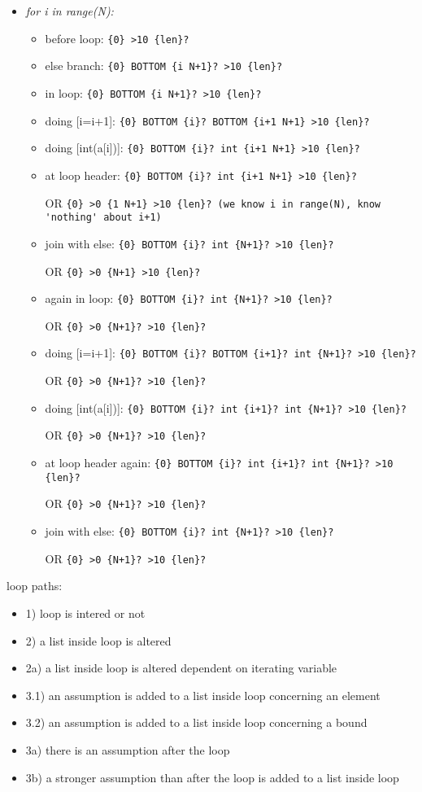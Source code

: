 \documentclass[11pt]{article}
\begin{document}
\begin{itemize}
\item \textit{for i in range(N):}
\begin{itemize}
\item before loop: \verb|{0} >10 {len}?|
\item else branch: \verb|{0} BOTTOM {i N+1}? >10 {len}?|
\item in loop: \verb|{0} BOTTOM {i N+1}? >10 {len}?|
\item doing [i=i+1]: \verb|{0} BOTTOM {i}? BOTTOM {i+1 N+1} >10 {len}?|
\item doing [int(a[i])]: \verb|{0} BOTTOM {i}? int {i+1 N+1} >10 {len}?|
\item at loop header: \verb|{0} BOTTOM {i}? int {i+1 N+1} >10 {len}?| 

OR \verb|{0} >0 {1 N+1} >10 {len}? (we know i in range(N), know 'nothing' about i+1)|
\item join with else: \verb|{0} BOTTOM {i}? int {N+1}? >10 {len}?| 

OR \verb|{0} >0 {N+1} >10 {len}?|
\item again in loop: \verb|{0} BOTTOM {i}? int {N+1}? >10 {len}?| 

OR \verb|{0} >0 {N+1}? >10 {len}?|
\item doing [i=i+1]: \verb|{0} BOTTOM {i}? BOTTOM {i+1}? int {N+1}? >10 {len}?| 

OR \verb|{0} >0 {N+1}? >10 {len}?|
\item doing [int(a[i])]: \verb|{0} BOTTOM {i}? int {i+1}? int {N+1}? >10 {len}?|

OR \verb|{0} >0 {N+1}? >10 {len}?|
\item at loop header again: \verb|{0} BOTTOM {i}? int {i+1}? int {N+1}? >10 {len}?| 

OR \verb|{0} >0 {N+1}? >10 {len}?|
\item join with else: \verb|{0} BOTTOM {i}? int {N+1}? >10 {len}?| 

OR \verb|{0} >0 {N+1}? >10 {len}?|
\end{itemize}
\end{itemize}

loop paths:
\begin{itemize}
  \item 1) loop is intered or not
  \item 2) a list inside loop is altered
  \item 2a) a list inside loop is altered dependent on iterating variable
  \item 3.1) an assumption is added to a list inside loop concerning an element
  \item 3.2) an assumption is added to a list inside loop concerning a bound
  \item 3a) there is an assumption after the loop
  \item 3b) a stronger assumption than after the loop is added to a list inside loop
\end{itemize}
\end{document}
